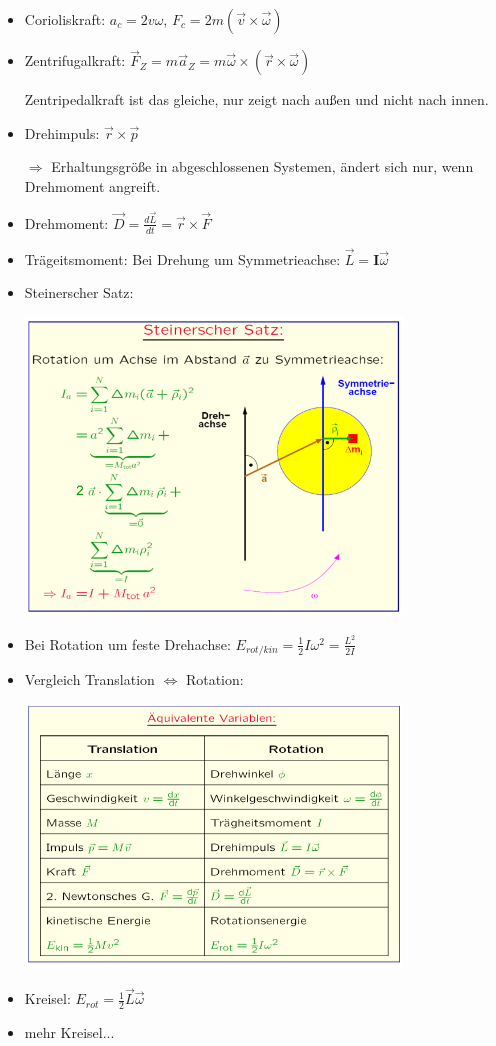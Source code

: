 \documentclass[a4paper,10pt, fleqn]{article}
\begin{document}
\begin{itemize}
\item Corioliskraft: $a_c = 2v\omega$, $F_c = 2m (\vec{v} \times \vec{\omega})$
\item Zentrifugalkraft: $\vec{F}_Z = m \vec{a}_Z = m \vec{\omega} \times (\vec{r}\times \vec{\omega})$

  Zentripedalkraft ist das gleiche, nur zeigt nach außen und nicht nach innen.
\item Drehimpuls: $\vec{r} \times \vec{p}$

  $\Rightarrow$ Erhaltungsgröße in abgeschlossenen Systemen, ändert sich nur, wenn Drehmoment angreift.
\item Drehmoment: $\vec{D} = \frac{d\vec{L}}{dt} = \vec{r} \times \vec{F}$
\item Trägeitsmoment: Bei Drehung um Symmetrieachse: $\vec{L} = \mathbf{I}\vec{\omega}$
\item Steinerscher Satz:

  \includegraphics[width=10cm]{SteinerscherSatz}
\item Bei Rotation um feste Drehachse: $E_{rot/kin} = \frac{1}{2}I\omega^2 = \frac{L^2}{2I}$
\item Vergleich Translation $\Leftrightarrow$ Rotation:

  \includegraphics[width=10cm]{TranslationVsRotation}
\item Kreisel: $E_{rot} = \frac{1}{2}\vec{L}\vec{\omega}$
\item mehr Kreisel...
\end{itemize}
\end{document}
